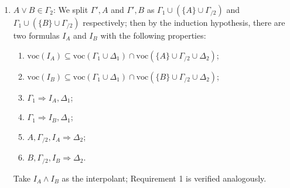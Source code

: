 \documentclass[a4paper]{article}
\newcommand{\voc}{\mathrm{voc}}
\begin{document}
\begin{itemize}
\begin{enumerate}
\begin{enumerate}
    \item $A,\Gamma_{/1} \Rightarrow I_A,\Delta_1$;
    \item $B,\Gamma_{/1} \Rightarrow I_B,\Delta_1$;
    \item $\Gamma_2,I_A \Rightarrow \Delta_2$;
    \item $\Gamma_2,I_B \Rightarrow \Delta_2$.
    \end{enumerate}
    We take $I_A \vee I_{B}$ as the interpolant.
    Note that $\voc(\{A\} \cup \Gamma_{/1} \cup \Delta_1) \subseteq \voc(\Gamma_1 \cup \Delta_1)$ and $\voc(\{B\} \cup \Gamma_{/1} \cup \Delta_1) \subseteq \voc(\Gamma_1 \cup \Delta_1)$.
    Hence Requirement 1 follows.

    Requirements 2 and 3 are verified by the following derivations respectively:
    \[
      \begin{prooftree}
        \hypo{A,\Gamma_{/1} \Rightarrow I_A,\Delta_1}
        \infer1[R$\vee$]{A, \Gamma_{/1} \Rightarrow I_A \vee I_B, \Delta_1}
        \hypo{B,\Gamma_{/1} \Rightarrow I_B,\Delta_1}
        \infer1[R$\vee$]{B, \Gamma_{/1} \Rightarrow I_A \vee I_B, \Delta_1}
        \infer2[L$\vee$ ($\Gamma_1 = \Gamma_{/1} \cup \{A \vee B\}$)]{A \vee B, \Gamma_{/1} \Rightarrow I_A \vee I_B, \Delta_1}
      \end{prooftree}
    \]
    \[
      \begin{prooftree}
        \hypo{\Gamma_2,I_A \Rightarrow \Delta_2}
        \hypo{\Gamma_2,I_B \Rightarrow \Delta_2}
        \infer2[L$\vee$]{\Gamma_2, I_A \vee I_B \Rightarrow \Delta_2}
      \end{prooftree}
    \]
  \item $A \vee B \in \Gamma_2$: We split $\Gamma',A$ and $\Gamma',B$ as $\Gamma_1 \cup (\{A\} \cup \Gamma_{/2})$ and $\Gamma_1 \cup (\{B\} \cup \Gamma_{/2})$ respectively; then by the induction hypothesis, there are two formulas $I_A$ and $I_B$ with the following properties:
    \begin{enumerate}
    \item $\voc(I_A) \subseteq \voc(\Gamma_1 \cup \Delta_1) \cap \voc(\{A\} \cup \Gamma_{/2} \cup \Delta_2)$;
    \item $\voc(I_B) \subseteq \voc(\Gamma_1 \cup \Delta_1) \cap \voc(\{B\} \cup \Gamma_{/2} \cup \Delta_2)$;
    \item $\Gamma_1 \Rightarrow I_A,\Delta_1$;
    \item $\Gamma_1 \Rightarrow I_B,\Delta_1$;
    \item $A,\Gamma_{/2},I_A \Rightarrow \Delta_2$;
    \item $B,\Gamma_{/2},I_B \Rightarrow \Delta_2$.
    \end{enumerate}
    Take $I_A \wedge I_B$ as the interpolant; Requirement 1 is verified analogously.


\end{enumerate}
\end{itemize}
\end{document}
